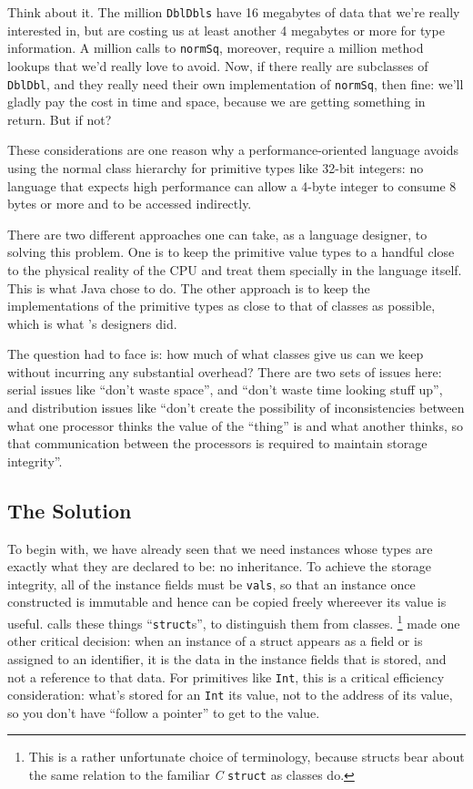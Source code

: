 Think about it.  The million {\tt DblDbls} have
16 megabytes of data that we're really interested in, but are costing us
at least another 4 megabytes or more for type information.  A million
calls to {\tt normSq}, moreover, require a million method lookups that
we'd really love to avoid.  Now, if
there really are subclasses of {\tt DblDbl}, and they really need their own
implementation of {\tt normSq}, then fine: we'll gladly pay the cost in time
and space, because we are getting something in return. But if not? 

These considerations are one reason why a performance-oriented language avoids
using the normal class hierarchy for primitive types like 32-bit integers: no language
that expects high performance can allow a 4-byte integer to consume 8 bytes or
more and to be accessed indirectly.  

There are two different approaches one can
take, as a language designer, to solving this problem.  One is to keep the
primitive value types to a handful close to the physical reality of the CPU
and treat them specially in the language itself.  This is what Java chose to do.
The other approach is to keep the implementations of the primitive
types as close to that of classes as possible, which is what \Xten's designers
did.

The question \Xten{} had to face is: how much of what classes give
us can we keep without incurring any substantial overhead? 
There are two sets of  issues here: serial issues like ``don't waste space'',
and ``don't waste time looking stuff up'', and distribution issues like ``don't
create the possibility of inconsistencies between what one processor thinks the
value of the ``thing'' is and what another thinks, so that communication
between the processors is required to maintain storage integrity''.

\subsection{The Solution}\label{sec:ecs}
To begin with, we have already seen that we need instances whose types are
exactly what they are declared to be: no inheritance.  To achieve the storage
integrity, all of the instance fields must be {\tt vals}, so that an
instance once constructed is immutable and hence can be copied freely
whereever its value is useful.  
\Xten{} calls these things ``{\tt struct}s'', to distinguish them from
classes.
\footnote{
This is a rather unfortunate choice of terminology, because \Xten{} structs  bear about the same
relation to the familiar {\em C} {\tt struct} as \Xten{} classes do.
}  
\Xten{} made one other critical decision: when an instance of a
struct appears as a field or is assigned to an identifier, it is the
data in the instance fields that is stored, and not a reference to that data.
For primitives like {\tt Int}, this is a critical efficiency consideration:
what's stored for an {\tt Int} its value, not to the address of its value, so
you don't have ``follow a pointer'' to get to the value.

